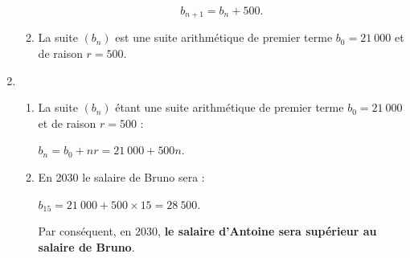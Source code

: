 \begin{corrige}
\begin{enumerate}
\begin{enumerate}[label=\alph*.]
               \par
               \[b_{n+1}=b_{n}+500.\]
               \par
               \item %
               \par
               La suite $(b_n)$ est une suite arithmétique de premier terme ${b_0=21\ 000}$ et de raison ${r=500}$.
          \end{enumerate}
          \par
          \item %
          \par
          \begin{enumerate}[label=\alph*.]
               \par
               \item %
               La suite $(b_n)$ étant une suite arithmétique de premier terme ${b_0=21\ 000}$ et de raison ${r=500}$ :
               \par
               $b_n=b_0+nr=21\ 000+500n$.
               \item %
               En 2030 le salaire de Bruno sera :
               \par
               $b_{15}=21~000 + 500 \times 15 = 28~500$.
               \par
               Par conséquent, en 2030, \textbf{le salaire d'Antoine sera supérieur au salaire de Bruno}.
               \par
          \end{enumerate}
          \par
     \end{enumerate}
     \par
     \par

\end{corrige}
